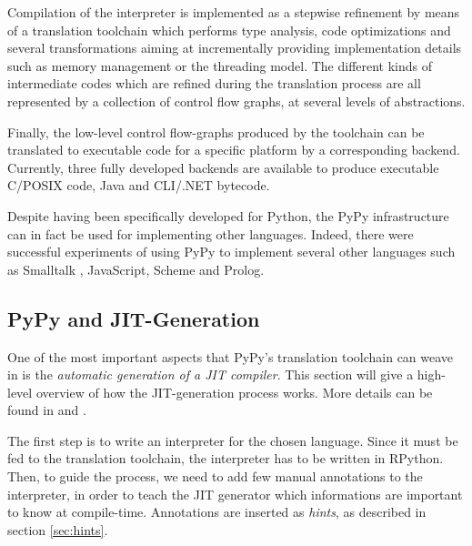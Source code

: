 Compilation of the interpreter is implemented as a stepwise
refinement by means of a translation toolchain which performs type
analysis, code optimizations and several transformations aiming at 
incrementally providing implementation details such as memory management or the threading model.
The different kinds of intermediate codes  which are refined 
during the translation process are all represented by a collection of control flow graphs,
at several levels of abstractions.

Finally, the low-level control flow-graphs produced by the toolchain
can be translated to executable code for a specific platform by a
corresponding backend.
Currently, three fully developed backends are available to produce
executable C/POSIX code, Java and CLI/.NET bytecode. 

Despite having been specifically developed for Python, the PyPy infrastructure
can in fact be used for implementing other languages. Indeed, there were
successful experiments of using PyPy to implement several other languages such
as Smalltalk \cite{BolzEtAl08}, JavaScript, Scheme and Prolog.


\subsection{PyPy and JIT-Generation}
\label{sec:jitgen}

One of the most important aspects that PyPy's translation toolchain can weave
in is the \emph{automatic generation of a JIT compiler}.  This section will
give a high-level overview of how the JIT-generation process works. More
details can be found in \cite{PyPyJIT} and \cite{PyPyJIT09}.

The first step is to write an interpreter for the chosen language.  Since it
must be fed to the translation toolchain, the interpreter has to be written in
RPython.  Then, to guide the process, we need to add few manual
annotations to the interpreter, in order to teach the JIT generator which
informations are important to know at compile-time.  Annotations are inserted
as \emph{hints}, as described in section \ref{sec:hints}.


